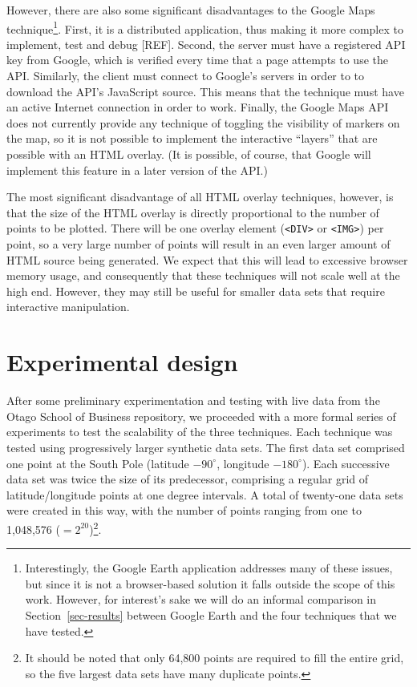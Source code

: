 \documentclass[acmtocl,acmnow]{acmtrans2m}
\begin{document}
However, there are also some significant disadvantages to the Google
Maps technique\footnote{Interestingly, the Google Earth application
addresses many of these issues, but since it is not a browser-based
solution it falls outside the scope of this work. However, for
interest's sake we will do an informal comparison in
Section~\ref{sec-results} between Google Earth and the four techniques
that we have tested.}. First, it is a distributed application, thus
making it more complex to implement, test and debug [REF]. Second, the
server must have a registered API key from Google, which is verified
every time that a page attempts to use the API. Similarly, the client
must connect to Google's servers in order to to download the API's
JavaScript source. This means that the technique must have an active
Internet connection in order to work. Finally, the Google Maps API does
not currently provide any technique of toggling the visibility of
markers on the map, so it is not possible to implement the interactive
``layers'' that are possible with an HTML overlay. (It is possible, of
course, that Google will implement this feature in a later version of
the API.)

The most significant disadvantage of all HTML overlay techniques,
however, is that the size of the HTML overlay is directly proportional
to the number of points to be plotted. There will be one overlay element
(\verb|<DIV>| or \verb|<IMG>|) per point, so a very large number of
points will result in an even larger amount of HTML source being
generated. We expect that this will lead to excessive browser memory
usage, and consequently that these techniques will not scale well at the
high end. However, they may still be useful for smaller data sets that
require interactive manipulation.


\section{Experimental design}
\label{sec-experiment}

After some preliminary experimentation and testing with live data from
the Otago School of Business repository, we proceeded with a more formal
series of experiments to test the scalability of the three techniques.
Each technique was tested using progressively larger synthetic data
sets. The first data set comprised one point at the South Pole (latitude
\(-90^{\circ}\), longitude \(-180^{\circ}\)). Each successive data set
was twice the size of its predecessor, comprising a regular grid of
latitude/longitude points at one degree intervals. A total of twenty-one
data sets were created in this way, with the number of points ranging
from one to 1,048,576 (\(=2^{20}\))\footnote{It should be noted that
only 64,800 points are required to fill the entire grid, so the five
largest data sets have many duplicate points.}.
\end{document}
